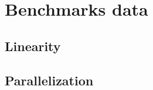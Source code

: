 \documentclass[12pt,a4paper]{article}
\begin{document}
\section{Benchmarks data} 

\subsection{Linearity}






\subsection{Parallelization}




\end{document}
